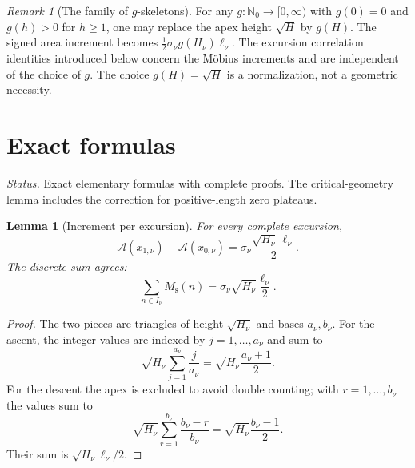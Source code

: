 \documentclass[11pt]{amsart}
\numberwithin{equation}{section}
\theoremstyle{plain}
\newtheorem{lemma}[theorem]{Lemma}
\theoremstyle{definition}
\theoremstyle{remark}
\newtheorem{remark}[theorem]{Remark}
\newcommand{\Ms}{M_{\mathrm{s}}}
\newcommand{\Anet}{\mathcal{A}}
\begin{document}
\begin{remark}[The family of $g$-skeletons]
\label{rem:g-skeleton}
For any $g:\mathbb N_0\to[0,\infty)$ with $g(0)=0$ and $g(h)>0$ for $h\ge1$,
one may replace the apex height $\sqrt H$ by $g(H)$. The signed area increment
becomes $\tfrac12\sigma_\nu g(H_\nu)\ell_\nu$.  The excursion correlation identities introduced below concern the M\"obius
increments and are independent of the choice of $g$.  The choice $g(H)=\sqrt H$ is a normalization,
not a geometric necessity.
\end{remark}

\section{Exact formulas}
\label{sec:formulas}

\noindent\emph{Status.} Exact elementary formulas with complete proofs.  The
critical-geometry lemma includes the correction for positive-length zero
plateaus.

\begin{lemma}[Increment per excursion]
\label{lem:jump}
For every complete excursion,
\begin{equation}
\label{eq:jump}
\Anet(x_{1,\nu})-\Anet(x_{0,\nu})
=\sigma_\nu\frac{\sqrt{H_\nu}\,\ell_\nu}{2}.
\end{equation}
The discrete sum agrees:
\begin{equation}
\label{eq:jump_discrete}
\sum_{n\in I_\nu}\Ms(n)
=\sigma_\nu\sqrt{H_\nu}\frac{\ell_\nu}{2}.
\end{equation}
\end{lemma}

\begin{proof}
The two pieces are triangles of height $\sqrt{H_\nu}$ and bases $a_\nu,b_\nu$.
For the ascent, the integer values are indexed by $j=1,\ldots,a_\nu$ and
sum to
\[
\sqrt{H_\nu}\sum_{j=1}^{a_\nu}\frac{j}{a_\nu}
=\sqrt{H_\nu}\frac{a_\nu+1}{2}.
\]
For the descent the apex is excluded to avoid double counting; with
$r=1,\ldots,b_\nu$ the values sum to
\[
\sqrt{H_\nu}\sum_{r=1}^{b_\nu}\frac{b_\nu-r}{b_\nu}
=\sqrt{H_\nu}\frac{b_\nu-1}{2}.
\]
Their sum is $\sqrt{H_\nu}\ell_\nu/2$.
\end{proof}
\end{document}
